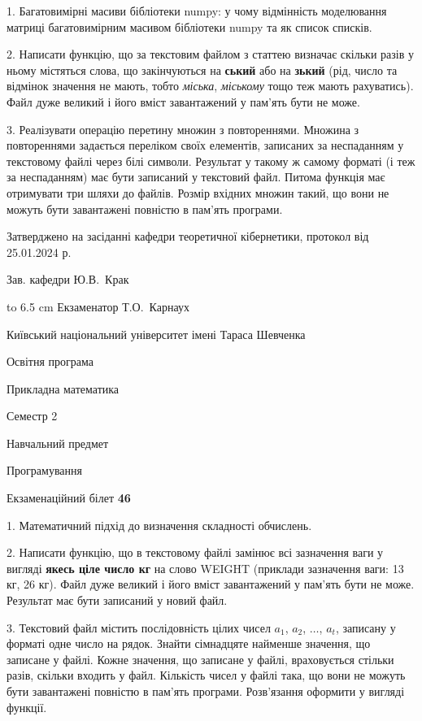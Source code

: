 \documentclass[12pt, ukrainian]{article}
\begin{document}
{%
1. Багатовимірні масиви бібліотеки numpy: у чому відмінність моделювання матриці багатовимірним масивом бібліотеки numpy та як список списків.%
\par
2. Написати функцію, що за текстовим файлом з статтею визначає  скільки разів у ньому містяться слова, що закінчуються на \textbf{ський} або на \textbf{зький} (рід, число та відмінок значення не мають, тобто \textit{міська}, \textit{міському} тощо теж мають рахуватись). Файл дуже великий і його вміст завантажений у пам'ять бути не може.

\par
3. Реалізувати операцію перетину множин з повтореннями. Множина з повтореннями задається переліком своїх елементів, записаних за неспаданням у текстовому файлі через білі символи. Результат у такому ж самому форматі (і теж за неспаданням) має бути записаний у текстовий файл. Питома функція має отримувати три шляхи до файлів. Розмір вхідних множин такий, що вони не можуть бути завантажені повністю в пам’ять програми.

}
{\smallskip\smallskip \begin {scriptsize} Затверджено на засіданні кафедри теоретичної кібернетики, протокол   від   25.01.2024 р.\par\smallskip\smallskip\smallskip\smallskip
{\parbox {6.5 cm} {Зав. кафедри \dotfill Ю.В.~Крак}}\hspace {0.7cm} {\hbox to 6.5 cm { Екзаменатор \dotfill Т.О.~Карнаух}} \end{scriptsize}}
\newpage
{{\begin {scriptsize}\par
{ \center  Київський національний університет імені Тараса Шевченка \par}
{\parbox {5 cm}{Освітня програма \hfill}{\parbox {7 cm}{Прикладна математика\hfill}}\parbox {6 cm}{\hfill Семестр 2}}\par
{\parbox {5 cm} {Навчальний предмет \hfill}\parbox {7 cm}{Програмування \hfill}\parbox {6cm}{\hfill}\par}\vspace{-15pt} \end{scriptsize}}{\center Екзаменаційний білет \No \textbf { 46 }\par}}
{%
1. Математичний підхід до визначення складності обчислень.%
\par
2. Написати функцію, що в текстовому файлі замінює всі зазначення ваги у вигляді \textbf{якесь ціле число кг} на слово WEIGHT (приклади зазначення ваги: 13 кг, 26   кг). Файл дуже великий і його вміст завантажений у пам'ять бути не може. Результат має бути записаний у новий файл.

\par
3. Текстовий файл містить послідовність цілих чисел $a_1$, $a_2$, $\ldots$, $a_t$, записану у форматі одне число на рядок. Знайти сімнадцяте найменше значення, що записане у файлі. Кожне значення, що записане у файлі, враховується стільки разів, скільки входить у файл. Кількість чисел у файлі така, що вони не можуть бути завантажені повністю в пам'ять програми. Розв'язання оформити у вигляді функції.

}
\end{document}
